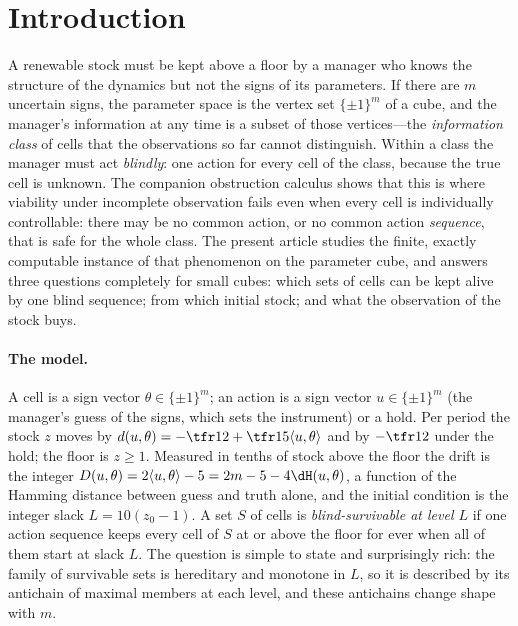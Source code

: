 \section{Introduction}\label{sec:intro}

A renewable stock must be kept above a floor by a manager who knows the structure of the dynamics but not the signs of its parameters. If there are $m$ uncertain signs, the parameter space is the vertex set $\{\pm1\}^m$ of a cube, and the manager's information at any time is a subset of those vertices---the \emph{information class} of cells that the observations so far cannot distinguish. Within a class the manager must act \emph{blindly}: one action for every cell of the class, because the true cell is unknown. The companion obstruction calculus \cite{Abaee2026calc} shows that this is where viability under incomplete observation fails even when every cell is individually controllable: there may be no common action, or no common action \emph{sequence}, that is safe for the whole class. The present article studies the finite, exactly computable instance of that phenomenon on the parameter cube, and answers three questions completely for small cubes: which sets of cells can be kept alive by one blind sequence; from which initial stock; and what the observation of the stock buys.

\paragraph{The model.}
A cell is a sign vector $\theta\in\{\pm1\}^m$; an action is a sign vector $u\in\{\pm1\}^m$ (the manager's guess of the signs, which sets the instrument) or a hold. Per period the stock $z$ moves by $d(u,\theta)=-\tfr12+\tfr15\langle u,\theta\rangle$ and by $-\tfr12$ under the hold; the floor is $z\ge1$. Measured in tenths of stock above the floor the drift is the integer $D(u,\theta)=2\langle u,\theta\rangle-5=2m-5-4\dH(u,\theta)$, a function of the Hamming distance between guess and truth alone, and the initial condition is the integer slack $L=10(z_0-1)$. A set $S$ of cells is \emph{blind-survivable at level $L$} if one action sequence keeps every cell of $S$ at or above the floor for ever when all of them start at slack $L$. The question is simple to state and surprisingly rich: the family of survivable sets is hereditary and monotone in $L$, so it is described by its antichain of maximal members at each level, and these antichains change shape with $m$.

